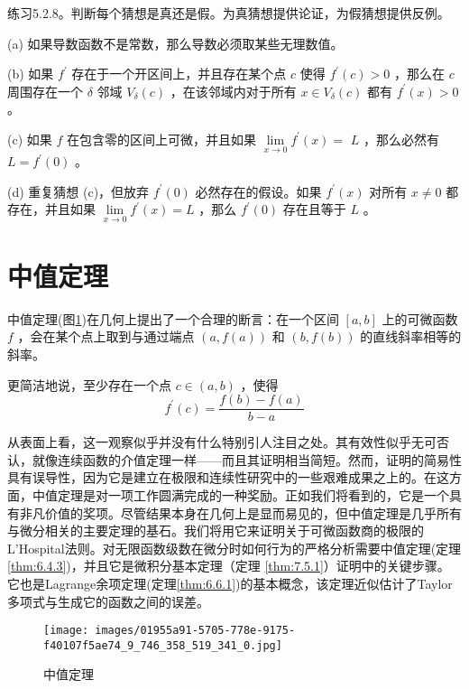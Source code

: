 练习5.2.8。判断每个猜想是真还是假。为真猜想提供论证，为假猜想提供反例。

(a) 如果导数函数不是常数，那么导数必须取某些无理数值。

(b) 如果 \({f}^{\prime }\) 存在于一个开区间上，并且存在某个点 \(c\) 使得 \({f}^{\prime }\left( c\right)  > 0\) ，那么在 \(c\) 周围存在一个 \(\delta\) 邻域 \({V}_{\delta }\left( c\right)\) ，在该邻域内对于所有 \(x \in  {V}_{\delta }\left( c\right)\) 都有 \({f}^{\prime }\left( x\right)  > 0\) 。

(c) 如果 \(f\) 在包含零的区间上可微，并且如果 \(\mathop{\lim }\limits_{{x \rightarrow  0}}{f}^{\prime }\left( x\right)  =\)  \(L\) ，那么必然有 \(L = {f}^{\prime }\left( 0\right)\) 。

(d) 重复猜想 (c)，但放弃 \({f}^{\prime }\left( 0\right)\) 必然存在的假设。如果 \({f}^{\prime }\left( x\right)\) 对所有 \(x \neq  0\) 都存在，并且如果 \(\mathop{\lim }\limits_{{x \rightarrow  0}}{f}^{\prime }\left( x\right)  = L\) ，那么 \({f}^{\prime }\left( 0\right)\) 存在且等于 \(L\) 。

\section{中值定理}
\label{sec:5.3}
中值定理(图\ref{fig:5.4})在几何上提出了一个合理的断言：在一个区间 \(\left\lbrack  {a,b}\right\rbrack\) 上的可微函数 \(f\) ，会在某个点上取到与通过端点 \(\left( {a,f\left( a\right) }\right)\) 和 \(\left( {b,f\left( b\right) }\right)\) 的直线斜率相等的斜率。

更简洁地说，至少存在一个点 \(c \in  \left( {a,b}\right)\) ，使得
\[
{f}^{\prime }\left( c\right)  = \frac{f\left( b\right)  - f\left( a\right) }{b - a}
\]



从表面上看，这一观察似乎并没有什么特别引人注目之处。其有效性似乎无可否认，就像连续函数的介值定理一样——而且其证明相当简短。然而，证明的简易性具有误导性，因为它是建立在极限和连续性研究中的一些艰难成果之上的。在这方面，中值定理是对一项工作圆满完成的一种奖励。正如我们将看到的，它是一个具有非凡价值的奖项。尽管结果本身在几何上是显而易见的，但中值定理是几乎所有与微分相关的主要定理的基石。我们将用它来证明关于可微函数商的极限的L'Hospital法则。对无限函数级数在微分时如何行为的严格分析需要中值定理(定理\ref{thm:6.4.3})，并且它是微积分基本定理（定理 \ref{thm:7.5.1}）证明中的关键步骤。它也是Lagrange余项定理(定理\ref{thm:6.6.1})的基本概念，该定理近似估计了Taylor多项式与生成它的函数之间的误差。

\begin{figure}[t]
  \centering
  \texttt{[image: images/01955a91-5705-778e-9175-f40107f5ae74\_9\_746\_358\_519\_341\_0.jpg]}
  \caption{中值定理}
  \label{fig:5.4}
\end{figure}

